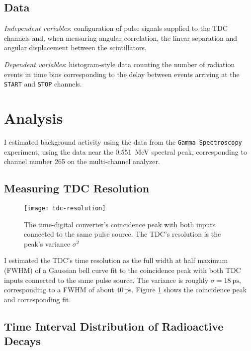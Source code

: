\documentclass[11pt, a4paper]{article}
\begin{document}
\subsection{Data}
\textit{Independent variables}: configuration of pulse signals supplied to the TDC channels and, when measuring angular correlation, the linear separation and angular displacement between the scintillators.

\textit{Dependent variables}: histogram-style data counting the number of radiation events in time bins corresponding to the delay between events arriving at the \texttt{START} and \texttt{STOP} channels.




\section{Analysis}
I estimated background activity using the data from the \texttt{Gamma Spectroscopy} experiment, using the data near the \SI{0.551}{\mega \electronvolt} spectral peak, corresponding to channel number 265 on the multi-channel analyzer.

\subsection{Measuring TDC Resolution}
\begin{figure}[htb!]
\centering
\texttt{[image: tdc-resolution]}
\caption{The time-digital converter's coincidence peak with both inputs connected to the same pulse source. The TDC's resolution is the peak's variance $ \sigma^{2} $}
\label{korzargam:fig:tdc-resolution}
\end{figure}
I estimated the TDC's time resolution as the full width at half maximum (FWHM) of a Gaussian bell curve fit to the coincidence peak with both TDC inputs connected to the same pulse source. The variance is roughly $ \sigma = \SI{18}{\pico \second} $, corresponding to a FWHM of about $ \SI{40}{\pico \second} $. Figure \ref{korzargam:fig:tdc-resolution} shows the coincidence peak and corresponding fit. 


\subsection{Time Interval Distribution of Radioactive Decays}
\end{document}
